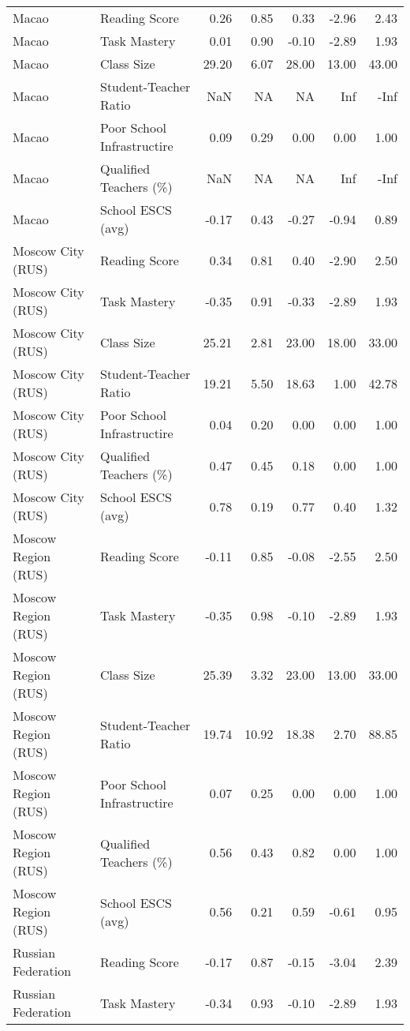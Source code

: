 \documentclass[
]{article}
\begin{document}
\begin{table}
\begin{tabular*}{\linewidth}{@{\extracolsep{\fill}}llrrrrr}
Macao & Reading Score & 0.26 & 0.85 & 0.33 & -2.96 & 2.43 \\ 
Macao & Task Mastery & 0.01 & 0.90 & -0.10 & -2.89 & 1.93 \\ 
Macao & Class Size & 29.20 & 6.07 & 28.00 & 13.00 & 43.00 \\ 
Macao & Student-Teacher Ratio & NaN & NA & NA & Inf & -Inf \\ 
Macao & Poor School Infrastructire & 0.09 & 0.29 & 0.00 & 0.00 & 1.00 \\ 
Macao & Qualified Teachers (\%) & NaN & NA & NA & Inf & -Inf \\ 
Macao & School ESCS (avg) & -0.17 & 0.43 & -0.27 & -0.94 & 0.89 \\ 
Moscow City (RUS) & Reading Score & 0.34 & 0.81 & 0.40 & -2.90 & 2.50 \\ 
Moscow City (RUS) & Task Mastery & -0.35 & 0.91 & -0.33 & -2.89 & 1.93 \\ 
Moscow City (RUS) & Class Size & 25.21 & 2.81 & 23.00 & 18.00 & 33.00 \\ 
Moscow City (RUS) & Student-Teacher Ratio & 19.21 & 5.50 & 18.63 & 1.00 & 42.78 \\ 
Moscow City (RUS) & Poor School Infrastructire & 0.04 & 0.20 & 0.00 & 0.00 & 1.00 \\ 
Moscow City (RUS) & Qualified Teachers (\%) & 0.47 & 0.45 & 0.18 & 0.00 & 1.00 \\ 
Moscow City (RUS) & School ESCS (avg) & 0.78 & 0.19 & 0.77 & 0.40 & 1.32 \\ 
Moscow Region (RUS) & Reading Score & -0.11 & 0.85 & -0.08 & -2.55 & 2.50 \\ 
Moscow Region (RUS) & Task Mastery & -0.35 & 0.98 & -0.10 & -2.89 & 1.93 \\ 
Moscow Region (RUS) & Class Size & 25.39 & 3.32 & 23.00 & 13.00 & 33.00 \\ 
Moscow Region (RUS) & Student-Teacher Ratio & 19.74 & 10.92 & 18.38 & 2.70 & 88.85 \\ 
Moscow Region (RUS) & Poor School Infrastructire & 0.07 & 0.25 & 0.00 & 0.00 & 1.00 \\ 
Moscow Region (RUS) & Qualified Teachers (\%) & 0.56 & 0.43 & 0.82 & 0.00 & 1.00 \\ 
Moscow Region (RUS) & School ESCS (avg) & 0.56 & 0.21 & 0.59 & -0.61 & 0.95 \\ 
Russian Federation & Reading Score & -0.17 & 0.87 & -0.15 & -3.04 & 2.39 \\ 
Russian Federation & Task Mastery & -0.34 & 0.93 & -0.10 & -2.89 & 1.93 \\ 

\end{tabular*}
\end{table}
\end{document}
